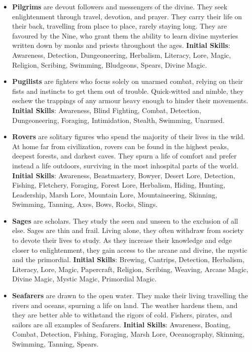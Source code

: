 \documentclass{article}
\begin{document}
\begin{itemize}
\item {\bf Pilgrims} are devout followers and messengers of the divine.  
They seek enlightenment through travel, devotion, and prayer.  They carry 
their life on their back, travelling from place to place, rarely staying 
long.  They are favoured by the Nine, who grant them the ability to learn
divine mysteries written down by monks and priests throughout the ages.
\textbf{Initial Skills}: Awareness, Detection, Dungeoneering, Herbalism,
Literacy, Lore, Magic, Religion, Scribing, Swimming, Bludgeons, Spears,
Divine Magic.

\item {\bf Pugilists} are fighters who focus solely on unarmed combat, 
relying on their fists and instincts to get them out of trouble.  
Quick-witted and nimble, they eschew the trappings of any armour heavy 
enough to hinder their movements.  \textbf{Initial Skills}: Awareness,
Blind Fighting, Combat, Detection, Dungeoneering, Foraging, Intimidation,
Stealth, Swimming, Unarmed.

\item {\bf Rovers} are solitary figures who spend the majority of their 
lives in the wild.  At home far from civilization, rovers can be found in 
the highest peaks, deepest forests, and darkest caves.  They spurn a life 
of comfort and prefer instead a life outdoors, surviving in the most 
inhospital parts of the world.  \textbf{Initial Skills}: Awareness,
Beastmastery, Bowyer, Desert Lore, Detection, Fishing, Fletchery, Foraging,
Forest Lore, Herbalism, Hiding, Hunting, Leadership, Marsh Lore,
Mountain Lore, Mountaineering, Skinning, Swimming, Tanning, Axes,
Bows, Rocks, Slings.

\item {\bf Sages} are scholars.  They study the seen and unseen to the 
exclusion of all else.  Sages are thin and frail.  Living alone, they often
withdraw from society to devote their lives to study.  As they increase 
their knowledge and edge closer to enlightenment, they gain access to the 
arcane and divine, the mystic and the primordial.  \textbf{Initial Skills}:
Brewing, Cantrips, Detection, Herbalism, Literacy, Lore, Magic, Papercraft,
Religion, Scribing, Weaving, Arcane Magic, Divine Magic, Mystic Magic,
Primordial Magic.

\item {\bf Seafarers} are drawn to the open water.  They make their living 
travelling the rivers and oceans, spurning a life on land.  The weather 
hardens them, and they are better able to withstand the rigors of cold.  
Fishers, pirates, and sailors are all examples of Seafarers.
\textbf{Initial Skills}: Awareness, Boating, Combat, Detection, Fishing,
Foraging, Marsh Lore, Oceanography, Skinning, Swimming, Tanning, Spears.


\end{itemize}
\end{document}
